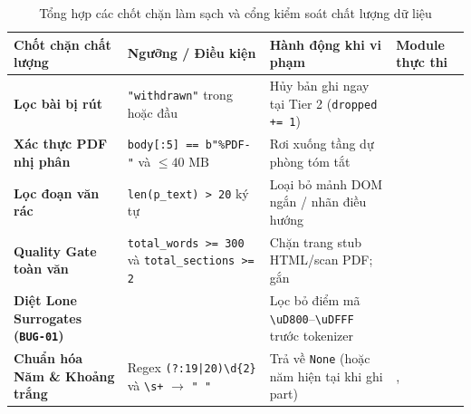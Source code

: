 \begin{table}[htbp]
  \centering
  \small
  \caption[Tổng hợp các quy tắc làm sạch và cổng chất lượng dữ liệu]{Tổng hợp các chốt chặn làm sạch và cổng kiểm soát chất lượng dữ liệu}
  \label{tab:ch2_quality_gates}
  \setlength{\tabcolsep}{3.5pt}
  \begin{tabularx}{\linewidth}{|>{\raggedright\arraybackslash}p{32mm}|>{\raggedright\arraybackslash}p{39mm}|>{\raggedright\arraybackslash}p{39mm}|L|}
    \hline
    \textbf{Chốt chặn chất lượng} & \textbf{Ngưỡng / Điều kiện} & \textbf{Hành động khi vi phạm} & \textbf{Module thực thi} \\
    \hline
    \textbf{Lọc bài bị rút} & \texttt{"withdrawn"} trong  hoặc đầu  & Hủy bản ghi ngay tại Tier 2 (\texttt{dropped += 1}) &  \\
    \hline
    \textbf{Xác thực PDF nhị phân} & \texttt{body[:5] == b"\%PDF-"} và $\le 40\text{ MB}$ & Rơi xuống tầng dự phòng tóm tắt &  \\
    \hline
    \textbf{Lọc đoạn văn rác} & \texttt{len(p\_text) > 20} ký tự & Loại bỏ mảnh DOM ngắn / nhãn điều hướng &  \\
    \hline
    \textbf{Quality Gate toàn văn} & \texttt{total\_words >= 300} và \texttt{total\_sections >= 2} & Chặn trang stub HTML/scan PDF; gắn  &  \\
    \hline
    \textbf{Diệt Lone Surrogates (\texttt{BUG-01})} &  & Lọc bỏ điểm mã \texttt{\textbackslash uD800}--\texttt{\textbackslash uDFFF} trước tokenizer &  \\
    \hline
    \textbf{Chuẩn hóa Năm \& Khoảng trắng} & Regex \texttt{(?:19|20)\textbackslash d\{2\}} và \texttt{\textbackslash s+} $\rightarrow$ \texttt{" "} & Trả về \texttt{None} (hoặc năm hiện tại khi ghi part) & ,  \\
    \hline
  \end{tabularx}
\end{table}
\FloatBarrier
